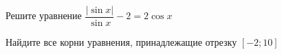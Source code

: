 \begin{ex}
	\begin{condition}
		\begin{enumcols}[label=\asbuk*)]
			\item Решите уравнение \( \dfrac{|\sin x|}{\sin x}- 2 =2\cos x \)
			\item Найдите все корни уравнения, принадлежащие отрезку \( \left[-2;10\right] \)
		\end{enumcols}
	\end{condition}
\end{ex}